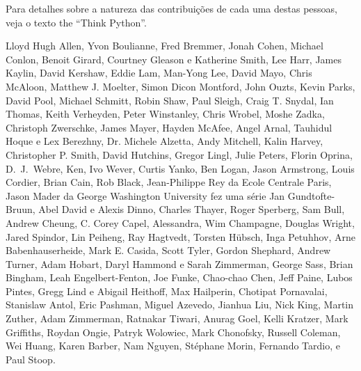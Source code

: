 Para detalhes sobre a natureza das contribuições de cada uma destas pessoas, 
veja o texto the ``Think Python''.

Lloyd Hugh Allen,
Yvon Boulianne,
Fred Bremmer,
Jonah Cohen,
Michael Conlon,
Benoit Girard,
Courtney Gleason e Katherine Smith,
Lee Harr,
James Kaylin,
David Kershaw,
Eddie Lam,
Man-Yong Lee,
David Mayo,
Chris McAloon,
Matthew J. Moelter,
Simon Dicon Montford,
John Ouzts,
Kevin Parks,
David Pool,
Michael Schmitt,
Robin Shaw,
Paul Sleigh,
Craig T. Snydal,
Ian Thomas,
Keith Verheyden,
Peter Winstanley,
Chris Wrobel,
Moshe Zadka,
Christoph Zwerschke,
James Mayer,
Hayden McAfee,
Angel Arnal,
Tauhidul Hoque e Lex Berezhny,
Dr. Michele Alzetta,
Andy Mitchell,
Kalin Harvey,
Christopher P. Smith,
David Hutchins,
Gregor Lingl,
Julie Peters,
Florin Oprina,
D.~J.~Webre,
Ken,
Ivo Wever,
Curtis Yanko,
Ben Logan,
Jason Armstrong,
Louis Cordier,
Brian Cain,
Rob Black,
Jean-Philippe Rey da Ecole Centrale Paris,
Jason Mader da George Washington University fez uma série
Jan Gundtofte-Bruun,
Abel David e Alexis Dinno,
Charles Thayer,
Roger Sperberg,
Sam Bull,
Andrew Cheung,
C. Corey Capel,
Alessandra,
Wim Champagne,
Douglas Wright,
Jared Spindor,
Lin Peiheng,
Ray Hagtvedt,
Torsten H\"{u}bsch,
Inga Petuhhov,
Arne Babenhauserheide,
Mark E. Casida,
Scott Tyler,
Gordon Shephard,
Andrew Turner,
Adam Hobart,
Daryl Hammond e Sarah Zimmerman,
George Sass,
Brian Bingham,
Leah Engelbert-Fenton,
Joe Funke,
Chao-chao Chen,
Jeff Paine,
Lubos Pintes,
Gregg Lind e Abigail Heithoff,
Max Hailperin,
Chotipat Pornavalai,
Stanislaw Antol,
Eric Pashman,
Miguel Azevedo,
Jianhua Liu,
Nick King,
Martin Zuther,
Adam Zimmerman,
Ratnakar Tiwari,
Anurag Goel,
Kelli Kratzer,
Mark Griffiths,
Roydan Ongie,
Patryk Wolowiec,
Mark Chonofsky,
Russell Coleman,
Wei Huang,
Karen Barber,
Nam Nguyen,
St\'{e}phane Morin,
Fernando Tardio,
e
Paul Stoop.

